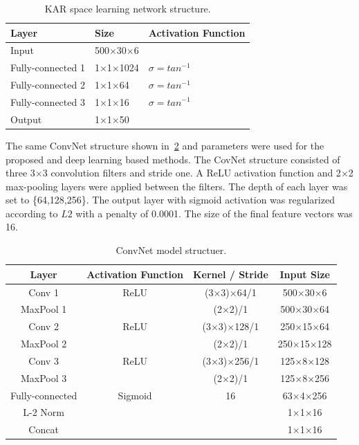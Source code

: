 \begin{table}[]
    \caption{KAR space learning network structure.}
    \label{kar_structure}
    \centering
    \begin{tabular}{|l|l|l|}
    \hline
    Layer   & Size     & Activation Function \\ \hline
    Input   & 500$\times$30$\times$6 &            \\
    Fully-connected 1 & 1$\times$1$\times$1024 & $\sigma = {tan}^{-1}$     \\
    Fully-connected 2 & 1$\times$1$\times$64 & $\sigma = {tan}^{-1}$     \\
    Fully-connected 3 & 1$\times$1$\times$16  & $\sigma = {tan}^{-1}$     \\
    Output  & 1$\times$1$\times$50   &            \\ \hline
    \end{tabular}
\end{table}
The same ConvNet structure shown in~\ref{conv_structure} and parameters were used for the proposed and deep learning based methods. The CovNet structure consisted of three 3$\times$3 convolution filters and stride one. A ReLU activation function and 2$\times$2 max-pooling layers were applied between the filters. The depth of each layer was set to \{64,128,256\}. The output layer with sigmoid activation was regularized according to $L2$ with a penalty of 0.0001. The size of the final feature vectors was 16.
\begin{table}[]
    \caption{ConvNet model structuer.}
    \label{conv_structure}
    \centering
    \begin{tabular}{|c|c|c|c|}
    \hline
    Layer     & Activation Function & Kernel / Stride & Input Size \\ \hline
    Conv 1    & ReLU       & (3$\times$3)$\times$64/1      & 500$\times$30$\times$6   \\
    MaxPool 1 &            & (2$\times$2)/1         & 500$\times$30$\times$64  \\
    Conv 2    & ReLU       & (3$\times$3)$\times$128/1     & 250$\times$15$\times$64 \\
    MaxPool 2 &            & (2$\times$2)/1         & 250$\times$15$\times$128 \\
    Conv 3    & ReLU       & (3$\times$3)$\times$256/1     & 125$\times$8$\times$128  \\
    MaxPool 3 &            & (2$\times$2)/1         & 125$\times$8$\times$256  \\
    Fully-connected     & Sigmoid    & 16             & 63$\times$4$\times$256   \\
    L-2 Norm  &            &                 & 1$\times$1$\times$16    \\
    Concat    &            &                 & 1$\times$1$\times$16    \\ \hline
    \end{tabular}
\end{table}
